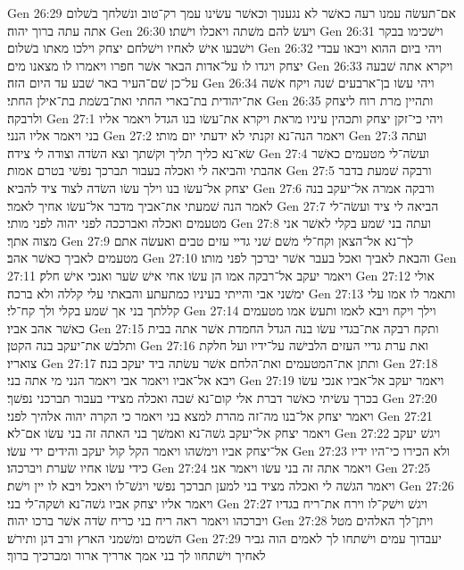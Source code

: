 Gen 26:29  אם־תעשׂה עמנו רעה כאשׁר לא נגענוך וכאשׁר עשׂינו עמך רק־טוב ונשׁלחך בשׁלום אתה עתה ברוך יהוה׃
Gen 26:30  ויעשׂ להם משׁתה ויאכלו וישׁתו׃
Gen 26:31  וישׁכימו בבקר וישׁבעו אישׁ לאחיו וישׁלחם יצחק וילכו מאתו בשׁלום׃
Gen 26:32  ויהי ביום ההוא ויבאו עבדי יצחק ויגדו לו על־אדות הבאר אשׁר חפרו ויאמרו לו מצאנו מים׃
Gen 26:33  ויקרא אתה שׁבעה על־כן שׁם־העיר באר שׁבע עד היום הזה׃
Gen 26:34  ויהי עשׂו בן־ארבעים שׁנה ויקח אשׁה את־יהודית בת־בארי החתי ואת־בשׂמת בת־אילן החתי׃
Gen 26:35  ותהיין מרת רוח ליצחק ולרבקה׃
Gen 27:1  ויהי כי־זקן יצחק ותכהין עיניו מראת ויקרא את־עשׂו בנו הגדל ויאמר אליו בני ויאמר אליו הנני׃
Gen 27:2  ויאמר הנה־נא זקנתי לא ידעתי יום מותי׃
Gen 27:3  ועתה שׂא־נא כליך תליך וקשׁתך וצא השׂדה וצודה לי צידה׃
Gen 27:4  ועשׂה־לי מטעמים כאשׁר אהבתי והביאה לי ואכלה בעבור תברכך נפשׁי בטרם אמות׃
Gen 27:5  ורבקה שׁמעת בדבר יצחק אל־עשׂו בנו וילך עשׂו השׂדה לצוד ציד להביא׃
Gen 27:6  ורבקה אמרה אל־יעקב בנה לאמר הנה שׁמעתי את־אביך מדבר אל־עשׂו אחיך לאמר׃
Gen 27:7  הביאה לי ציד ועשׂה־לי מטעמים ואכלה ואברככה לפני יהוה לפני מותי׃
Gen 27:8  ועתה בני שׁמע בקלי לאשׁר אני מצוה אתך׃
Gen 27:9  לך־נא אל־הצאן וקח־לי משׁם שׁני גדיי עזים טבים ואעשׂה אתם מטעמים לאביך כאשׁר אהב׃
Gen 27:10  והבאת לאביך ואכל בעבר אשׁר יברכך לפני מותו׃
Gen 27:11  ויאמר יעקב אל־רבקה אמו הן עשׂו אחי אישׁ שׂער ואנכי אישׁ חלק׃
Gen 27:12  אולי ימשׁני אבי והייתי בעיניו כמתעתע והבאתי עלי קללה ולא ברכה׃
Gen 27:13  ותאמר לו אמו עלי קללתך בני אך שׁמע בקלי ולך קח־לי׃
Gen 27:14  וילך ויקח ויבא לאמו ותעשׂ אמו מטעמים כאשׁר אהב אביו׃
Gen 27:15  ותקח רבקה את־בגדי עשׂו בנה הגדל החמדת אשׁר אתה בבית ותלבשׁ את־יעקב בנה הקטן׃
Gen 27:16  ואת ערת גדיי העזים הלבישׁה על־ידיו ועל חלקת צואריו׃
Gen 27:17  ותתן את־המטעמים ואת־הלחם אשׁר עשׂתה ביד יעקב בנה׃
Gen 27:18  ויבא אל־אביו ויאמר אבי ויאמר הנני מי אתה בני׃
Gen 27:19  ויאמר יעקב אל־אביו אנכי עשׂו בכרך עשׂיתי כאשׁר דברת אלי קום־נא שׁבה ואכלה מצידי בעבור תברכני נפשׁך׃
Gen 27:20  ויאמר יצחק אל־בנו מה־זה מהרת למצא בני ויאמר כי הקרה יהוה אלהיך לפני׃
Gen 27:21  ויאמר יצחק אל־יעקב גשׁה־נא ואמשׁך בני האתה זה בני עשׂו אם־לא׃
Gen 27:22  ויגשׁ יעקב אל־יצחק אביו וימשׁהו ויאמר הקל קול יעקב והידים ידי עשׂו׃
Gen 27:23  ולא הכירו כי־היו ידיו כידי עשׂו אחיו שׂערת ויברכהו׃
Gen 27:24  ויאמר אתה זה בני עשׂו ויאמר אני׃
Gen 27:25  ויאמר הגשׁה לי ואכלה מציד בני למען תברכך נפשׁי ויגשׁ־לו ויאכל ויבא לו יין וישׁת׃
Gen 27:26  ויאמר אליו יצחק אביו גשׁה־נא ושׁקה־לי בני׃
Gen 27:27  ויגשׁ וישׁק־לו וירח את־ריח בגדיו ויברכהו ויאמר ראה ריח בני כריח שׂדה אשׁר ברכו יהוה׃
Gen 27:28  ויתן־לך האלהים מטל השׁמים ומשׁמני הארץ ורב דגן ותירשׁ׃
Gen 27:29  יעבדוך עמים וישׁתחו לך לאמים הוה גביר לאחיך וישׁתחוו לך בני אמך ארריך ארור ומברכיך ברוך׃
